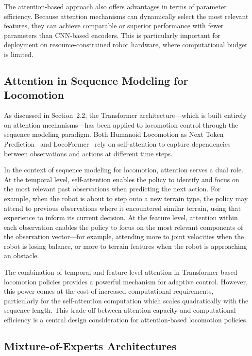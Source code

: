 The attention-based approach also offers advantages in terms of parameter efficiency. Because attention mechanisms can dynamically select the most relevant features, they can achieve comparable or superior performance with fewer parameters than CNN-based encoders. This is particularly important for deployment on resource-constrained robot hardware, where computational budget is limited.

\subsection{Attention in Sequence Modeling for Locomotion}

As discussed in Section~2.2, the Transformer architecture---which is built entirely on attention mechanisms---has been applied to locomotion control through the sequence modeling paradigm. Both Humanoid Locomotion as Next Token Prediction~\cite{radosavovic2024nexttoken} and LocoFormer~\cite{liu2024locoformer} rely on self-attention to capture dependencies between observations and actions at different time steps.

In the context of sequence modeling for locomotion, attention serves a dual role. At the temporal level, self-attention enables the policy to identify and focus on the most relevant past observations when predicting the next action. For example, when the robot is about to step onto a new terrain type, the policy may attend to previous observations where it encountered similar terrain, using that experience to inform its current decision. At the feature level, attention within each observation enables the policy to focus on the most relevant components of the observation vector---for example, attending more to joint velocities when the robot is losing balance, or more to terrain features when the robot is approaching an obstacle.

The combination of temporal and feature-level attention in Transformer-based locomotion policies provides a powerful mechanism for adaptive control. However, this power comes at the cost of increased computational requirements, particularly for the self-attention computation which scales quadratically with the sequence length. This trade-off between attention capacity and computational efficiency is a central design consideration for attention-based locomotion policies.

\subsection{Mixture-of-Experts Architectures}

